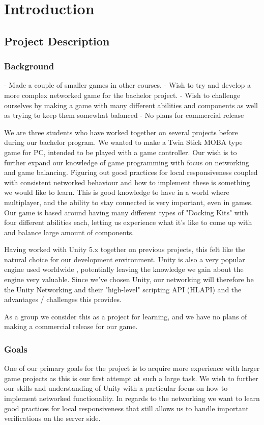 \chapter{Introduction}
\label{chap:introduction}

\section{Project Description}
\subsection{Background}
 - Made a couple of smaller games in other courses. 
 - Wish to try and develop a more complex networked game for the bachelor project.
 - Wish to challenge ourselves by making a game with many different abilities and components as well as trying to keep them somewhat balanced 
 - No plans for commercial release

We are three students who have worked together on several projects before during our bachelor program. We wanted to make a Twin Stick MOBA type game for PC, intended to be played with a game controller. Our wish is to further expand our knowledge of game programming with focus on networking and game balancing. Figuring out good practices for local responsiveness coupled with consistent networked behaviour and how to implement these is something we would like to learn. This is good knowledge to have in a world where multiplayer, and the ability to stay connected is very important, even in games. Our game is based around having many different types of "Docking Kits" with four different abilities each, letting us experience what it's like to come up with and balance large amount of components.

Having worked with Unity 5.x together on previous projects, this felt like the natural choice for our development environment. Unity is also a very popular engine used worldwide \cite{unityUsageStatistics}, potentially leaving the knowledge we gain about the engine very valuable. Since we've chosen Unity, our networking will therefore be the Unity Networking and their "high-level" scripting API (HLAPI) \cite{unityUNETManual} and the advantages / challenges this provides.

As a group we consider this as a project for learning, and we have no plans of making a commercial release for our game. 

\subsection{Goals}
One of our primary goals for the project is to acquire more experience with larger game projects as this is our first attempt at such a large task. We wish to further our skills and understanding of Unity with a particular focus on how to implement networked functionality. 
In regards to the networking we want to learn good practices for local responsiveness that still allows us to handle important verifications on the server side. 

